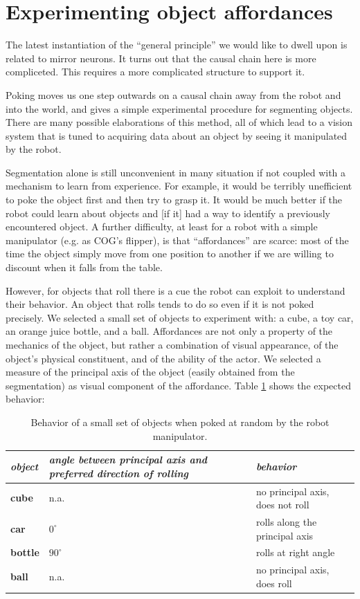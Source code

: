 
\section{Experimenting object affordances}

\ifverbose
The latest instantiation of the ``general principle'' we would like to
dwell upon is related to mirror neurons. It turns out that the causal
chain here is more compliceted. This requires a more complicated
structure to support it.
\fi

Poking moves us one step outwards on a causal chain away from the
robot and into the world, and gives a simple experimental procedure
for segmenting objects.  There are many possible elaborations of this
method, all of which lead to a vision system that is tuned to 
acquiring data about an object by seeing it manipulated by the robot.  

Segmentation alone is still unconvenient in many situation if not 
coupled with a mechanism to learn from experience. For example, it 
would be terribly unefficient to poke the object first and then try 
to grasp it. It would be much better if the robot could learn about
objects and [if it] had a way to identify a previously encountered object. 
A further difficulty, at least for a robot with a simple 
manipulator (e.g. as COG's flipper), is that ``affordances'' are scarce: 
most of the time the object simply move from one position
to another if we are willing to discount when it falls from the table.

However, for objects that roll there is a cue the robot can exploit
to understand their behavior. An object that rolls tends to do so even 
if it is not poked precisely. We selected a small set of objects to
experiment with: a cube, a toy car, an orange juice bottle, and a ball.
Affordances are not only a property of the mechanics of the object, but 
rather a combination of visual appearance, of the object's physical 
constituent, and of the ability of the actor. We selected a measure of
the principal axis of the object (easily obtained from the segmentation)
as visual component of the affordance. Table \ref{tab:affordances} shows the expected
behavior:

\begin{table}[htbp]
\begin{center}
\begin{tabular}{|p{2cm}|p{3.5cm}|p{5cm}|}
\hline
{\it object} & {\it angle between principal axis and preferred direction of rolling} &  {\it behavior} \\ \hline\hline
{\bf cube} & n.a. & no principal axis, does not roll\\ \hline
{\bf car} & $0^\circ$ & rolls along the principal axis\\ \hline
{\bf bottle} &  $90^\circ$ & rolls at right angle\\ \hline
{\bf ball} &  n.a. & no principal axis, does roll\\ \hline
\end{tabular}
\caption{
\label{tab:affordances}
%
Behavior of a small set of objects when poked at random by the robot manipulator.
%
}
\end{center}
\end{table}

